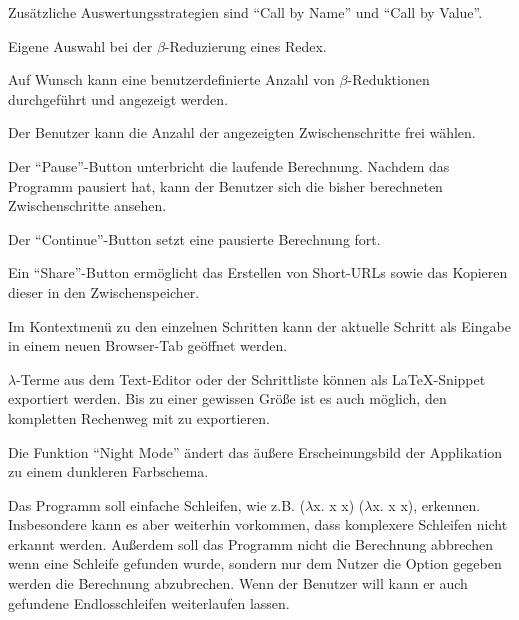 \documentclass[parskip=full,11pt,twoside]{scrartcl}
\begin{document}
Zusätzliche Auswertungsstrategien sind \enquote{Call by Name} und \enquote{Call by Value}.

Eigene Auswahl bei der $\beta$-Reduzierung eines Redex.

Auf Wunsch kann eine benutzerdefinierte Anzahl von $\beta$-Reduktionen durchgeführt und angezeigt werden.

Der Benutzer kann die Anzahl der angezeigten Zwischenschritte frei wählen.

Der \enquote{Pause}-Button unterbricht die laufende Berechnung. Nachdem das Programm pausiert hat, kann der Benutzer sich die bisher berechneten Zwischenschritte ansehen.

Der \enquote{Continue}-Button setzt eine pausierte Berechnung fort.

Ein \enquote{Share}-Button ermöglicht das Erstellen von Short-URLs sowie das Kopieren dieser in den Zwischenspeicher.

Im Kontextmenü zu den einzelnen Schritten kann der aktuelle Schritt als Eingabe in einem neuen Browser-Tab geöffnet werden.

$\lambda$-Terme aus dem Text-Editor oder der Schrittliste können als LaTeX-Snippet exportiert werden. Bis zu einer gewissen Größe ist es auch möglich, den kompletten Rechenweg mit zu exportieren.

Die Funktion \enquote{Night Mode} ändert das äußere Erscheinungsbild der Applikation zu einem dunkleren Farbschema.

Das Programm soll einfache Schleifen, wie z.B. ($\lambda$x. x x) ($\lambda$x. x x), erkennen. Insbesondere kann es aber weiterhin vorkommen, dass komplexere Schleifen nicht erkannt werden.
Außerdem soll das Programm nicht die Berechnung abbrechen wenn eine Schleife gefunden wurde, sondern nur dem Nutzer die Option gegeben werden die Berechnung abzubrechen. Wenn der Benutzer  will kann er auch gefundene Endlosschleifen weiterlaufen lassen.
\end{document}
